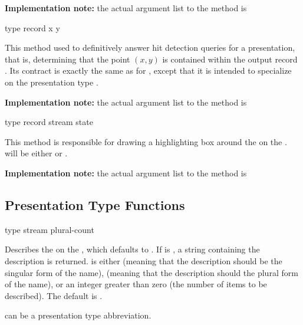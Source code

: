 {\bf Implementation note:} the actual argument list to the
 method is
\\


 {type record x y}

This method used to definitively answer hit detection queries for a
presentation, that is, determining that the point $(x,y)$ is contained within
the output record .  Its contract is exactly the same as for
, except that it is intended to
specialize on the presentation type .

{\bf Implementation note:} the actual argument list to the
 method is
\\


 {type record stream state}

This method is responsible for drawing a highlighting box around the
  on the 
.   will be either  or .

{\bf Implementation note:} the actual argument list to the
 method is
\\



\subsection {Presentation Type Functions}

 {type \optional stream plural-count}

Describes the   on the 
, which defaults to .  If  is
, a string containing the description is returned.  
is either  (meaning that the description should be the singular form of
the name),  (meaning that the description should the plural form of the
name), or an integer greater than zero (the number of items to be described).
The default is .

 can be a presentation type abbreviation.


